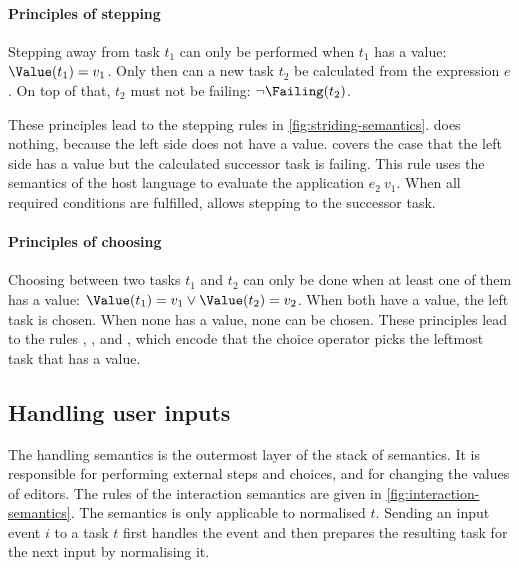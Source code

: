 \paragraph{Principles of stepping}
\label{sub:stepping-principles}

Stepping away from task $t_1$ can only be performed when
$t_1$ has a value: $\Value(t_1) = v_1$.
Only then can a new task $t_2$ be calculated from the expression $e$.
On top of that, $t_2$ must not be failing: $\neg\Failing(t_2)$.

These principles lead to the stepping rules in \cref{fig:striding-semantics}.
 does nothing,
because the left side does not have a value.
 covers the case that
the left side has a value but the calculated successor task is failing.
This rule uses the semantics of the host language to evaluate the application $e_2\ v_1$.
When all required conditions are fulfilled,  allows stepping to the successor task.



\paragraph{Principles of choosing}
\label{sub:choosing-principles}

Choosing between two tasks $t_1$ and $t_2$ can only be done when
at least one of them has a value: $\Value(t_1) = v_1 \lor \Value(t_2) = v_2$.
When both have a value, the left task is chosen.
When none has a value, none can be chosen.
These principles lead to the rules , , and ,
which encode that the choice operator picks the leftmost task that has a value.



\subsection{Handling user inputs}
\label{sec:handling}

The handling semantics is the outermost layer of the stack of semantics.
It is responsible for performing external steps and choices, and for changing the values of editors.
The rules of the interaction semantics are given in \cref{fig:interaction-semantics}.
The semantics is only applicable to normalised $t$.
Sending an input event $i$ to a task $t$ first handles the event and then prepares the resulting task for the next input by normalising it.

